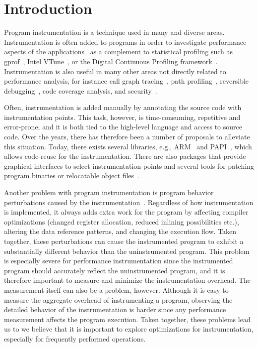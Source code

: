 
\section{Introduction}
Program instrumentation is a technique used in many and diverse areas.
Instrumentation is often added to programs in order to investigate performance
aspects of the applications~\cite{paradyn95,etch} as a complement to
statistical profiling such as gprof~\cite{graham83gprof}, Intel
VTune~\cite{wolf99vtune}, or the Digital Continuous Profiling
framework~\cite{anderson97cpw}. Instrumentation is also useful in many
other areas not directly related to performance analysis, for instance call
graph tracing~\cite{steignerwilke2003verstehen}, path
profiling~\cite{ball96efficient}, reversible
debugging~\cite{chen2001reversible}, code coverage analysis, and
security~\cite{miller01pib}.

Often, instrumentation is added manually by annotating the source code with
instrumentation points. This task, however, is time-consuming, repetitive and
error-prone, and it is both tied to the high-level language and access to
source code. Over the years, there has therefore been a number of proposals to
alleviate this situation. Today, there exists several libraries, e.g.,
ARM~\cite{armAPI} and PAPI~\cite{london2001papi}, which allows code-reuse for
the instrumentation.  There are also packages that provide graphical
interfaces to select instrumentation-points and several tools for patching
program binaries or relocatable object files~\cite{paradyn95,eel}.

Another problem with program instrumentation is program behavior perturbations
caused by the
instrumentation~\cite{maloney1992instrumentation,moseley2003checking}.
Regardless of how instrumentation is implemented, it always adds extra work
for the program by affecting compiler optimizations (changed register
allocation, reduced inlining possibilities etc.), altering the data reference
patterns, and changing the execution flow.  Taken together, these
perturbations can cause the instrumented program to exhibit a substantially
different behavior than the uninstrumented program.  This problem is
especially severe for performance instrumentation since the instrumented
program should accurately reflect the uninstrumented program, and it is
therefore important to measure and minimize the instrumentation overhead. The
measurement itself can also be a problem, however. Although it is easy to
measure the aggregate overhead of instrumenting a program, observing the
detailed behavior of the instrumentation is harder since any performance
measurement affects the program execution. Taken together, these problems lead
us to we believe that it is important to explore optimizations for
instrumentation, especially for frequently performed operations.

